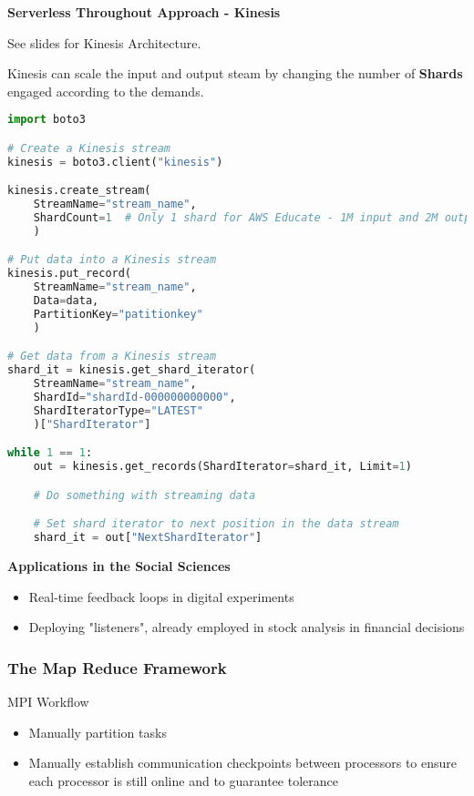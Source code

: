 \documentclass{article}
\begin{document}
\textbf{Serverless Throughout Approach - Kinesis}

See slides for Kinesis Architecture.

Kinesis can scale the input and output steam by changing the number of \textbf{Shards} engaged according to the demands.

\begin{lstlisting}[language=Python]
import boto3

# Create a Kinesis stream
kinesis = boto3.client("kinesis")

kinesis.create_stream(
    StreamName="stream_name",
    ShardCount=1  # Only 1 shard for AWS Educate - 1M input and 2M output
    )

# Put data into a Kinesis stream
kinesis.put_record(
    StreamName="stream_name",
    Data=data,
    PartitionKey="patitionkey"
    )

# Get data from a Kinesis stream
shard_it = kinesis.get_shard_iterator(
    StreamName="stream_name",
    ShardId="shardId-000000000000",
    ShardIteratorType="LATEST"
    )["ShardIterator"]

while 1 == 1:
    out = kinesis.get_records(ShardIterator=shard_it, Limit=1)

    # Do something with streaming data

    # Set shard iterator to next position in the data stream
    shard_it = out["NextShardIterator"]
\end{lstlisting}

\textbf{Applications in the Social Sciences}

\begin{itemize}
    \item Real-time feedback loops in digital experiments
    \item Deploying "listeners", already employed in stock analysis in financial decisions
\end{itemize}

\subsubsection{The Map Reduce Framework}

MPI Workflow

\begin{itemize}
    \item Manually partition tasks
    \item Manually establish communication checkpoints between processors to ensure each processor is still online and to guarantee tolerance
\end{itemize}
\end{document}
